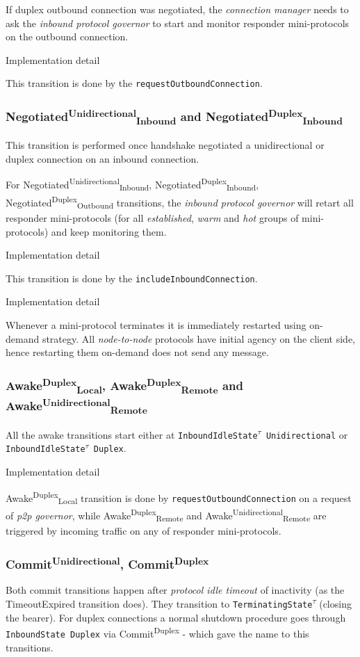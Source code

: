 \documentclass{article}
\def\InboundStateDup{\texttt{InboundState Duplex}}
\def\InboundIdleStateUni{\texttt{InboundIdleState\textsuperscript{$\tau$} Unidirectional}}
\def\InboundIdleStateDup{\texttt{InboundIdleState\textsuperscript{$\tau$} Duplex}}
\def\TerminatingState{\texttt{TerminatingState\textsuperscript{$\tau$}}}
\def\NegotiatedDupOut{\textsf{Negotiated}\textsuperscript{\textsf{Duplex}}\textsubscript{\textsf{Outbound}}}
\def\NegotiatedUniIn{\textsf{Negotiated}\textsuperscript{\textsf{Unidirectional}}\textsubscript{\textsf{Inbound}}}
\def\NegotiatedDupIn{\textsf{Negotiated}\textsuperscript{\textsf{Duplex}}\textsubscript{\textsf{Inbound}}}
\def\TimeoutExpired{\textsf{TimeoutExpired}}
\def\CommitDup{\textsf{Commit}\textsuperscript{\textsf{Duplex}}}
\def\CommitUni{\textsf{Commit}\textsuperscript{\textsf{Unidirectional}}}
\def\AwakeDupRem{\textsf{Awake}\textsuperscript{\textsf{Duplex}}\textsubscript{\textsf{Remote}}}
\def\AwakeUniRem{\textsf{Awake}\textsuperscript{\textsf{Unidirectional}}\textsubscript{\textsf{Remote}}}
\def\AwakeDupLoc{\textsf{Awake}\textsuperscript{\textsf{Duplex}}\textsubscript{\textsf{Local}}}
\def\warm{\textit{warm}}
\def\hot{\textit{hot}}
\def\established{\textit{established}}
\def\ptopgov{\textit{p2p governor}}
\def\inbgov{\textit{inbound protocol governor}}
\def\connmngr{\textit{connection manager}}
\newenvironment{detail}
  {
    \begin{center}
    \begin{minipage}{0.9\textwidth}
      \begin{shaded}
      \small
      \noindent Implementation detail
      \vspace{0.3em}
      \newline
      \itshape
  }
  {
  \end{shaded}
  \end{minipage}
  \end{center}
  \vspace{1em}
  }
\begin{document}
If duplex outbound connection was negotiated, the \connmngr{} needs to ask the
\inbgov{} to start and monitor responder mini-protocols on the outbound
connection.

\begin{detail}
This transition is done by the \texttt{requestOutboundConnection}.
\end{detail}


\subsubsection{\NegotiatedUniIn{} and \NegotiatedDupIn{}}
This transition is performed once handshake negotiated a unidirectional or
duplex connection on an inbound connection.

For \NegotiatedUniIn{}, \NegotiatedDupIn{}, \NegotiatedDupOut{}
transitions, the \textit{inbound protocol governor} will retart all responder
mini-protocols (for all \established{}, \warm{} and \hot{} groups of
mini-protocols) and keep monitoring them.

\begin{detail}
This transition is done by the \texttt{includeInboundConnection}.
\end{detail}

\begin{detail}
  Whenever a mini-protocol terminates it is immediately restarted using
  on-demand strategy.  All \textit{node-to-node} protocols have initial agency
  on the client side, hence restarting them on-demand does not send any
  message.
\end{detail}


\subsubsection{\AwakeDupLoc{}, \AwakeDupRem{} and \AwakeUniRem{}}
All the awake transitions start either at \InboundIdleStateUni{} or
\InboundIdleStateDup{}.

\begin{detail}
  \AwakeDupLoc{} transition is done by \texttt{requestOutboundConnection} on
  a request of \ptopgov{}, while \AwakeDupRem{} and \AwakeUniRem{} are
  triggered by incoming traffic on any of responder mini-protocols.
\end{detail}


\subsubsection{\CommitUni{}, \CommitDup{}}\label{sec:tr_commit}
Both commit transitions happen after \textit{protocol idle timeout} of
inactivity (as the \TimeoutExpired{} transition does).  They transition to
\TerminatingState{} (closing the bearer).  For duplex connections a normal
shutdown procedure goes through \InboundStateDup{}
via \CommitDup{} - which gave the name to this transitions.
\end{document}
